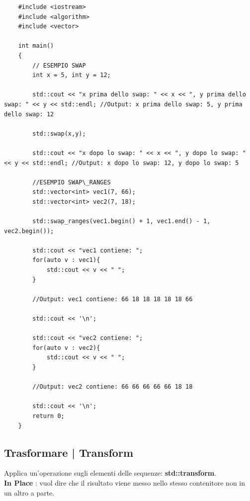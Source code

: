 \begin{lstlisting}
	#include <iostream>
	#include <algorithm>
	#include <vector>
	
	int main()
	{
		// ESEMPIO SWAP
		int x = 5, int y = 12;
		
		std::cout << "x prima dello swap: " << x << ", y prima dello swap: " << y << std::endl; //Output: x prima dello swap: 5, y prima dello swap: 12
		
		std::swap(x,y);
		
		std::cout << "x dopo lo swap: " << x << ", y dopo lo swap: " << y << std::endl; //Output: x dopo lo swap: 12, y dopo lo swap: 5
		
		//ESEMPIO SWAP\_RANGES
		std::vector<int> vec1(7, 66);
		std::vector<int> vec2(7, 18);
		
		std::swap_ranges(vec1.begin() + 1, vec1.end() - 1, vec2.begin());
		
		std::cout << "vec1 contiene: ";
		for(auto v : vec1){
			std::cout << v << " ";
		}
	
		//Output: vec1 contiene: 66 18 18 18 18 18 66
		
		std::cout << '\n';
		
		std::cout << "vec2 contiene: ";
		for(auto v : vec2){
			std::cout << v << " ";
		}
	
		//Output: vec2 contiene: 66 66 66 66 66 18 18
		
		std::cout << '\n';
		return 0;
	}
\end{lstlisting}

\subsection{Trasformare | Transform}

\textsf{\small Applica un'operazione sugli elementi delle sequenze: \textbf{std::transform}.} \\

\textsf{\small \textbf{In Place} : vuol dire che il risultato viene messo nello stesso contenitore non in un altro a parte.} \\

